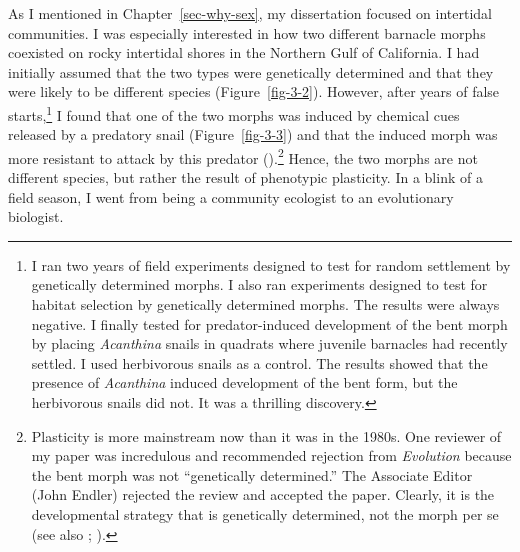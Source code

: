 \documentclass[
  american,
  letterpaper,
]{book}
\begin{document}
As I mentioned in Chapter~\ref{sec-why-sex}, my dissertation focused on
intertidal communities. I was especially interested in how two different
barnacle morphs coexisted on rocky intertidal shores in the Northern
Gulf of California. I had initially assumed that the two types were
genetically determined and that they were likely to be different species
(Figure~\ref{fig-3-2}). However, after years of false starts,\footnote{I
  ran two years of field experiments designed to test for random
  settlement by genetically determined morphs. I also ran experiments
  designed to test for habitat selection by genetically determined
  morphs. The results were always negative. I finally tested for
  predator-induced development of the bent morph by placing
  \emph{Acanthina} snails in quadrats where juvenile barnacles had
  recently settled. I used herbivorous snails as a control. The results
  showed that the presence of \emph{Acanthina} induced development of
  the bent form, but the herbivorous snails did not. It was a thrilling
  discovery.} I found that one of the two morphs was induced by chemical
cues released by a predatory snail (Figure~\ref{fig-3-3}) and that the
induced morph was more resistant to attack by this predator
().\footnote{Plasticity is more
  mainstream now than it was in the 1980s. One reviewer of my paper was
  incredulous and recommended rejection from \emph{Evolution} because
  the bent morph was not ``genetically determined.'' The Associate
  Editor (John Endler) rejected the review and accepted the paper.
  Clearly, it is the developmental strategy that is genetically
  determined, not the morph per se (see also
  ;
  ).} Hence, the two
morphs are not different species, but rather the result of phenotypic
plasticity. In a blink of a field season, I went from being a community
ecologist to an evolutionary biologist.
\end{document}
